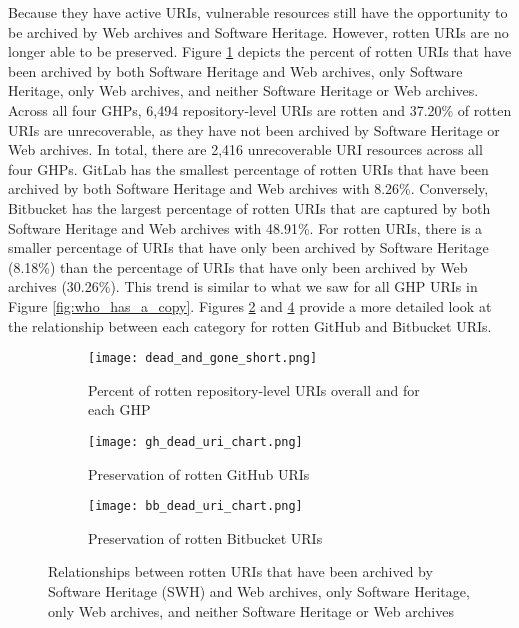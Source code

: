 Because they have active URIs, vulnerable resources still have the opportunity to be archived by Web archives and Software Heritage. However, rotten URIs are no longer able to be preserved. Figure \ref{fig:dead_and_gone} depicts the percent of rotten URIs that have been archived by both Software Heritage and Web archives, only Software Heritage, only Web archives, and neither Software Heritage or Web archives. Across all four GHPs, 6,494 repository-level URIs are rotten and 37.20\% of rotten URIs are unrecoverable, as they have not been archived by Software Heritage or Web archives. In total, there are 2,416 unrecoverable URI resources across all four GHPs. GitLab has the smallest percentage of rotten URIs that have been archived by both Software Heritage and Web archives with 8.26\%. Conversely, Bitbucket has the largest percentage of rotten URIs that are captured by both Software Heritage and Web archives with 48.91\%. For rotten URIs, there is a smaller percentage of URIs that have only been archived by Software Heritage (8.18\%) than the percentage of URIs that have only been archived by Web archives (30.26\%). This trend is similar to what we saw for all GHP URIs in Figure \ref{fig:who_has_a_copy}. Figures \ref{fig:gh_dead_sankey} and \ref{fig:bb_dead_sankey} provide a more detailed look at the relationship between each category for rotten GitHub and Bitbucket URIs. 

\begin{figure}
\centering
\begin{subfigure}{0.8\textwidth}
    \centering
    \texttt{[image: dead\_and\_gone\_short.png]}
    \caption{Percent of rotten repository-level URIs overall and for each GHP}
    \label{fig:dead_and_gone}
\end{subfigure}
\centering
\begin{subfigure}{0.8\textwidth}
    \centering
    \texttt{[image: gh\_dead\_uri\_chart.png]}
    \caption{Preservation of rotten GitHub URIs}
    \label{fig:gh_dead_sankey}
\end{subfigure}
\begin{subfigure}{0.8\textwidth}
    \centering
    \texttt{[image: bb\_dead\_uri\_chart.png]}
    \caption{Preservation of rotten Bitbucket URIs}
    \label{fig:bb_dead_sankey}
\end{subfigure}
\caption{Relationships between rotten URIs that have been archived by Software Heritage (SWH) and Web archives, only Software Heritage, only Web archives, and neither Software Heritage or Web archives}
\end{figure}

